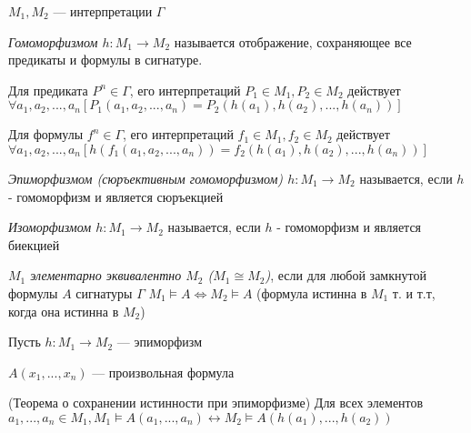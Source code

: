 \documentclass{article}
\begin{document}
\(M_1, M_2\) --- интерпретации \(\Gamma\)
\begin{definition}
	\textit{Гомоморфизмом \(h: M_1 \rightarrow M_2\)} называется отображение, сохраняющее все предикаты и формулы в сигнатуре.

	Для предиката \(P^n \in \Gamma\), его интерпретаций \(P_1 \in M_1, P_2 \in M_2\) действует \\
	\(\forall a_1, a_2,..., a_n[P_1(a_1, a_2,..., a_n) = P_2(h(a_1), h(a_2),..., h(a_n))]\)

	Для формулы \(f^n \in \Gamma\), его интерпретаций \(f_1 \in M_1, f_2 \in M_2\) действует \\
	\(\forall a_1, a_2,..., a_n[h(f_1(a_1, a_2,..., a_n)) = f_2(h(a_1), h(a_2),..., h(a_n))]\)
\end{definition}

\begin{definition}
	\textit{Эпиморфизмом (сюръективным гомоморфизмом) \(h: M_1 \rightarrow M_2\)} называется, если \(h\) - гомоморфизм и является сюръекцией
\end{definition}

\begin{definition}
	\textit{Изоморфизмом \(h: M_1 \rightarrow M_2\)} называется, если \(h\) - гомоморфизм и является биекцией
\end{definition}

\begin{definition}
	\textit{\(M_1\) элементарно эквивалентно \(M_2\) (\(M_1 \cong M_2\))}, если для любой замкнутой формулы \(A\) сигнатуры \(\Gamma\) \(M_1 \vDash A \Leftrightarrow M_2 \vDash A\) (формула истинна в \(M_1\) т. и т.т, когда она истинна в \(M_2\))
\end{definition}

Пусть \(h: M_1 \rightarrow M_2\) --- эпиморфизм

\(A(x_1,..., x_n)\) --- произвольная формула
\begin{theorem}{(Теорема о сохранении истинности при эпиморфизме)}
	Для всех элементов \(a_1,..., a_n \in M_1, M_1 \vDash A(a_1,..., a_n) \leftrightarrow M_2 \vDash A(h(a_1),..., h(a_2))\)
\end{theorem}
\end{document}
